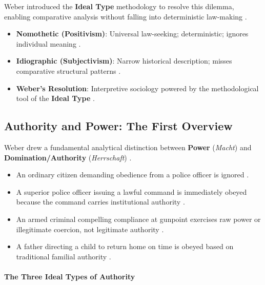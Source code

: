 Weber introduced the \textbf{Ideal Type} methodology to resolve this dilemma, enabling comparative analysis without falling into deterministic law-making .

\begin{QuickRevision}
\begin{itemize}
    \item \textbf{Nomothetic (Positivism)}: Universal law-seeking; deterministic; ignores individual meaning .
    \item \textbf{Idiographic (Subjectivism)}: Narrow historical description; misses comparative structural patterns .
    \item \textbf{Weber's Resolution}: Interpretive sociology powered by the methodological tool of the \textbf{Ideal Type} .
\end{itemize}
\end{QuickRevision}

\subsection{Authority and Power: The First Overview}

Weber drew a fundamental analytical distinction between \textbf{Power} (\textit{Macht}) and \textbf{Domination/Authority} (\textit{Herrschaft}) .

\begin{ExampleBox}
\begin{itemize}
    \item An ordinary citizen demanding obedience from a police officer is ignored .
    \item A superior police officer issuing a lawful command is immediately obeyed because the command carries institutional authority .
    \item An armed criminal compelling compliance at gunpoint exercises raw power or illegitimate coercion, not legitimate authority .
    \item A father directing a child to return home on time is obeyed based on traditional familial authority .
\end{itemize}
\end{ExampleBox}

\paragraph{The Three Ideal Types of Authority}


